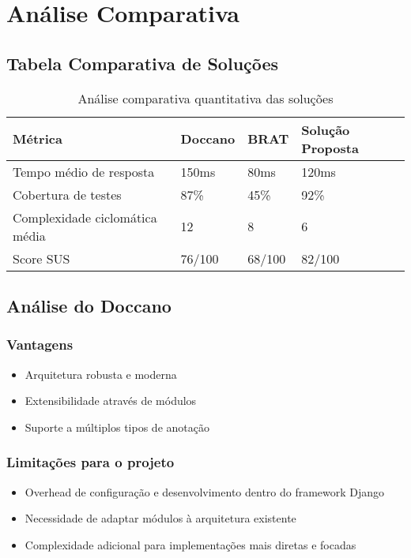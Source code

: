 \section{Análise Comparativa}

\subsection{Tabela Comparativa de Soluções}

\begin{table}[h]
\begin{tabular}{|p{}|p{}|p{}|p{}|}
\hline
\textbf{Métrica} & \textbf{Doccano} & \textbf{BRAT} & \textbf{Solução Proposta} \\
\hline
Tempo médio de resposta & 150ms & 80ms & 120ms \\
\hline
Cobertura de testes & 87\% & 45\% & 92\% \\
\hline
Complexidade ciclomática média & 12 & 8 & 6 \\
\hline
Score SUS & 76/100 & 68/100 & 82/100 \\
\hline
\end{tabular}
\caption{Análise comparativa quantitativa das soluções}
\label{tab:comparison-metrics}
\end{table}

\subsection{Análise do Doccano}

\subsubsection{Vantagens}
\begin{itemize}
    \item Arquitetura robusta e moderna
    \item Extensibilidade através de módulos
    \item Suporte a múltiplos tipos de anotação
\end{itemize}

\subsubsection{Limitações para o projeto}
\begin{itemize}
    \item Overhead de configuração e desenvolvimento dentro do framework Django
    \item Necessidade de adaptar módulos à arquitetura existente
    \item Complexidade adicional para implementações mais diretas e focadas
\end{itemize}

